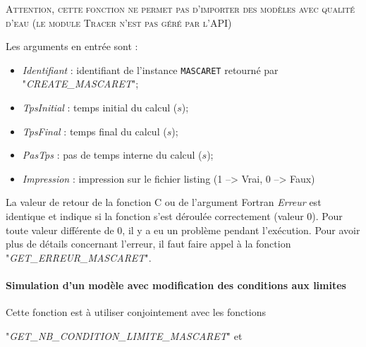 \documentclass[a4paper,11pt]{article}
\begin{document}
 \textsc{Attention, cette fonction ne permet pas d'importer des mod\`eles avec qualit\'e d'eau (le module Tracer n'est pas g\'er\'e par l'API)}

 \vspace{0.5cm}
 
 Les arguments en entr\'ee sont :
 
 \vspace{0.5cm}
 
 \begin{itemize}
 
    \item \textit{Identifiant} : identifiant de l'instance \texttt{MASCARET} retourn\'e par "\textit{CREATE\_MASCARET}";
    \vspace{0.5cm}
    \item \textit{TpsInitial} : temps initial du calcul ($s$);
    \vspace{0.5cm}
    \item \textit{TpsFinal} : temps final du calcul ($s$);
    \vspace{0.5cm}
    \item \textit{PasTps} : pas de temps interne du calcul ($s$);
    \vspace{0.5cm}
    \item \textit{Impression} : impression sur le fichier listing (1 --> Vrai, 0 --> Faux)
 \end{itemize}

\vspace{0.5cm}

 La valeur de retour de la fonction C ou de l'argument Fortran \textit{Erreur} est identique et indique si la fonction s'est d\'eroul\'ee correctement (valeur 0). Pour toute valeur diff\'erente de 0, il y a eu un probl\`eme pendant l'ex\'ecution. Pour avoir plus de d\'etails concernant l'erreur, il faut faire appel \`a la fonction "\textit{GET\_ERREUR\_MASCARET}".

\paragraph{Simulation d'un mod\`ele avec modification des conditions aux limites\\}

 \hspace*{1cm}

 Cette fonction est \`a utiliser conjointement avec les fonctions
 
 "\textit{GET\_NB\_CONDITION\_LIMITE\_MASCARET}" et
 
\end{document}
